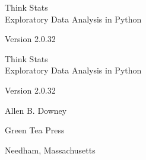 \documentclass[12pt]{book}
\newcommand{\thetitle}{Think Stats}
\newcommand{\thesubtitle}{Exploratory Data Analysis in Python}
\newcommand{\theversion}{2.0.32}
\begin{document}
\begin{latexonly}

\renewcommand{\blankpage}{\thispagestyle{empty} \quad \newpage}



\thispagestyle{empty}

\begin{flushright}
\vspace*{2.0in}

\begin{spacing}{3}
{\huge \thetitle}\\
{\Large \thesubtitle }
\end{spacing}

\vspace{0.25in}

Version \theversion

\vfill

\end{flushright}


\blankpage
\blankpage

\pagebreak
\thispagestyle{empty}

\begin{flushright}
\vspace*{2.0in}

\begin{spacing}{3}
{\huge \thetitle}\\
{\Large \thesubtitle}
\end{spacing}

\vspace{0.25in}

Version \theversion

\vspace{1in}


{\Large
Allen B. Downey\\
}


\vspace{0.5in}

{\Large Green Tea Press}

{\small Needham, Massachusetts}

\vfill


\end{flushright}
\end{latexonly}
\end{document}
